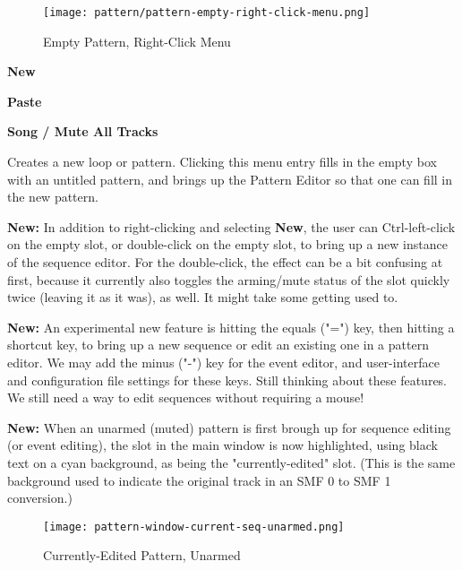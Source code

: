 \begin{figure}[H]
   \centering 
   \texttt{[image: pattern/pattern-empty-right-click-menu.png]}
   \caption{Empty Pattern, Right-Click Menu}
   \label{fig:pattern_window_empty_right_click}
\end{figure}

   \begin{enumber}
      \item \textbf{New}
      \item \textbf{Paste}
      \item \textbf{Song / Mute All Tracks}
   \end{enumber}

   \setcounter{ItemCounter}{0}      %

   Creates a new loop or pattern.
   Clicking this menu entry fills in the empty box with an untitled
   pattern, and brings up the Pattern Editor
   so that one can fill in the new pattern.

   \textbf{New:}
   In addition to right-clicking and selecting \textbf{New}, the user
   can Ctrl-left-click on the empty slot, or
   double-click on the empty slot, to bring up a new instance of the sequence
   editor.  For the double-click, the effect can be a bit confusing at first,
   because it currently also toggles the arming/mute status of the slot
   quickly twice (leaving it as it was), as well.  It might take some getting
   used to.

   \textbf{New:}
   An experimental new feature is hitting the equals ("=") key, then hitting
   a shortcut key, to bring up a new sequence or edit an existing one in a
   pattern editor.  We may add the minus ("-") key for the event editor, and
   user-interface and configuration file settings for these keys.
   Still thinking about these features.  We still need a way to edit sequences
   without requiring a mouse!

   \textbf{New:}
   When an unarmed (muted) pattern is first brough up for sequence editing (or
   event editing), the slot in the main window is now highlighted, using black
   text on a cyan background, as being the "currently-edited" slot.
   (This is the same background used to indicate the original track in an
   SMF 0 to SMF 1 conversion.)

\begin{figure}[H]
   \centering 
   \texttt{[image: pattern-window-current-seq-unarmed.png]}
   \caption{Currently-Edited Pattern, Unarmed}
   \label{fig:pattern_window_current_seq_unarmed}
\end{figure}


